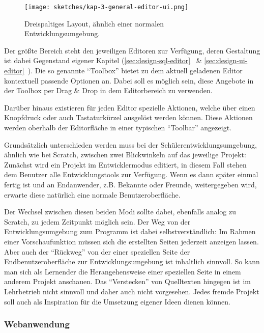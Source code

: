 \begin{figure}[h]
  \centering \texttt{[image: sketches/kap-3-general-editor-ui.png]}
  \caption{Dreispaltiges Layout, ähnlich einer normalen Entwicklungsumgebung.}
  \label{fig:ui-sketch-general}
\end{figure}

Der größte Bereich steht den jeweiligen Editoren zur Verfügung, deren Gestaltung ist dabei Gegenstand eigener Kapitel (\ref{sec:design-sql-editor}~ \& \ref{sec:design-ui-editor}~). Die so genannte "`Toolbox"' bietet zu dem aktuell geladenen Editor kontextuell passende Optionen an. Dabei soll es möglich sein, diese Angebote in der Toolbox per Drag \& Drop in dem Editorbereich zu verwenden.

Darüber hinaus existieren für jeden Editor spezielle Aktionen, welche über einen Knopfdruck oder auch Tastaturkürzel ausgelöst werden können. Diese Aktionen werden oberhalb der Editorfläche in einer typischen "`Toolbar"' angezeigt.

Grundsätzlich unterschieden werden muss bei der Schülerentwicklungsumgebung, ähnlich wie bei Scratch, zwischen zwei Blickwinkeln auf das jeweilige Projekt: Zunächst wird ein Projekt im Entwicklermodus editiert, in diesem Fall stehen dem Benutzer alle Entwicklungstools zur Verfügung. Wenn es dann später einmal fertig ist und an Endanwender, z.B. Bekannte oder Freunde, weitergegeben wird, erwarte diese natürlich eine normale Benutzeroberfläche.

Der Wechsel zwischen diesen beiden Modi sollte dabei, ebenfalls analog zu Scratch, zu jedem Zeitpunkt möglich sein. Der Weg von der Entwicklungsumgebung zum Programm ist dabei selbstverständlich: Im Rahmen einer Vorschaufunktion müssen sich die erstellten Seiten jederzeit anzeigen lassen. Aber auch der "`Rückweg"' von der einer speziellen Seite der Endbenutzeroberfläche zur Entwicklungsumgebung ist inhaltlich sinnvoll. So kann man sich als Lernender die Herangehensweise einer speziellen Seite in einem anderem Projekt anschauen. Das "`Verstecken"' von Quelltexten hingegen ist im Lehrbetrieb nicht sinnvoll und daher auch nicht vorgesehen. Jedes fremde Projekt soll auch als Inspiration für die Umsetzung eigener Ideen dienen können.

\subsubsection{Webanwendung}
\label{sec:req-web-application}

